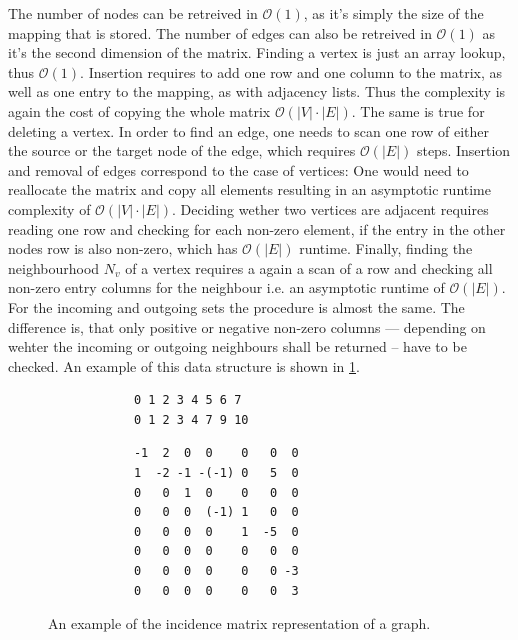             The number of nodes can be retreived in $\mathcal{O}(1)$, as it's simply the size of the mapping that is stored.
            The number of edges can also be retreived in $\mathcal{O}(1)$ as it's the second dimension of the matrix.
            Finding a vertex is just an array lookup, thus $\mathcal{O}(1)$.
            Insertion requires to add one row and one column to the matrix, as well as one entry to the mapping, as with adjacency lists. 
            Thus the complexity is again the cost of copying the whole matrix $\mathcal{O}(|V| \cdot |E|)$. 
            The same is true for deleting a vertex.         
            In order to find an edge, one needs to scan one row of either the source or the target node of the edge, which requires $\mathcal{O}(|E|)$ steps.
            Insertion and removal of edges correspond to the case of vertices: 
            One would need to reallocate the matrix and copy all elements resulting in an asymptotic runtime complexity of $\mathcal{O}(|V| \cdot |E|)$. 
            Deciding wether two vertices are adjacent requires reading one row and checking for each non-zero element, if the entry in the other nodes row is also non-zero, which has $\mathcal{O}(|E|)$ runtime.        
            Finally, finding the neighbourhood $N_v$ of a vertex requires a again a scan of a row and checking all non-zero entry columns for the neighbour i.e. an asymptotic runtime of $\mathcal{O}(|E|)$. 
            For the incoming and outgoing sets the procedure is almost the same. 
            The difference is, that only positive or negative non-zero columns --- depending on wehter the incoming or outgoing neighbours shall be returned -- have to be checked.
            An example of this data structure is shown in \ref{incm}.
        
        \begin{figure}[htp]
         \begin{center}
         \begin{verbatim}
            0 1 2 3 4 5 6 7
            0 1 2 3 4 7 9 10
          \end{verbatim}
          \begin{verbatim}
            -1  2  0  0    0   0  0
            1  -2 -1 -(-1) 0   5  0
            0   0  1  0    0   0  0
            0   0  0  (-1) 1   0  0
            0   0  0  0    1  -5  0
            0   0  0  0    0   0  0
            0   0  0  0    0   0 -3
            0   0  0  0    0   0  3
          \end{verbatim}
         \end{center}
         \caption{An example of the incidence matrix representation of a graph.}
         \label{incm}
        \end{figure}
        
